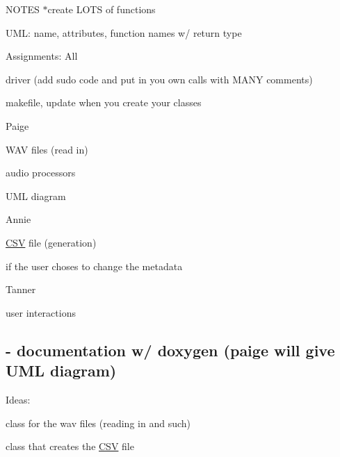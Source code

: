 N\+O\+T\+ES $\ast$create L\+O\+TS of functions

U\+ML\+: name, attributes, function names w/ return type

Assignments\+: All
\begin{DoxyItemize}
\item driver (add sudo code and put in you own calls with M\+A\+NY comments)
\item makefile, update when you create your classes
\end{DoxyItemize}

Paige
\begin{DoxyItemize}
\item W\+AV files (read in)
\item audio processors
\item U\+ML diagram
\end{DoxyItemize}

Annie
\begin{DoxyItemize}
\item \hyperlink{classCSV}{C\+SV} file (generation)
\item if the user choses to change the metadata
\end{DoxyItemize}

Tanner
\begin{DoxyItemize}
\item user interactions \subsection*{-\/ documentation w/ doxygen (paige will give U\+ML diagram) }
\end{DoxyItemize}

Ideas\+:
\begin{DoxyItemize}
\item class for the wav files (reading in and such)
\item class that creates the \hyperlink{classCSV}{C\+SV} file
\end{DoxyItemize}

